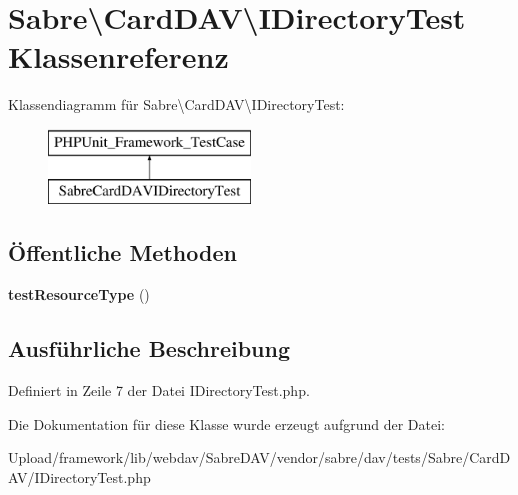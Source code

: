 \hypertarget{class_sabre_1_1_card_d_a_v_1_1_i_directory_test}{}\section{Sabre\textbackslash{}Card\+D\+AV\textbackslash{}I\+Directory\+Test Klassenreferenz}
\label{class_sabre_1_1_card_d_a_v_1_1_i_directory_test}
Klassendiagramm für Sabre\textbackslash{}Card\+D\+AV\textbackslash{}I\+Directory\+Test\+:\begin{figure}[H]
\begin{center}
\leavevmode
\includegraphics[height=2.000000cm]{class_sabre_1_1_card_d_a_v_1_1_i_directory_test}
\end{center}
\end{figure}
\subsection*{Öffentliche Methoden}
\begin{DoxyCompactItemize}
\item 
\mbox{\label{class_sabre_1_1_card_d_a_v_1_1_i_directory_test_a693b916360f3e8e9dd3aecd550eca4b2}} 
{\bfseries test\+Resource\+Type} ()
\end{DoxyCompactItemize}


\subsection{Ausführliche Beschreibung}


Definiert in Zeile 7 der Datei I\+Directory\+Test.\+php.



Die Dokumentation für diese Klasse wurde erzeugt aufgrund der Datei\+:\begin{DoxyCompactItemize}
\item 
Upload/framework/lib/webdav/\+Sabre\+D\+A\+V/vendor/sabre/dav/tests/\+Sabre/\+Card\+D\+A\+V/I\+Directory\+Test.\+php\end{DoxyCompactItemize}

